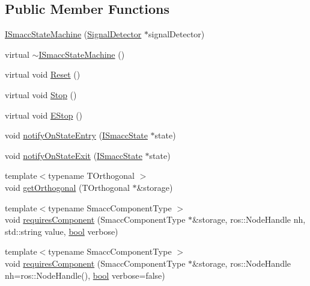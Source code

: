 \subsection*{Public Member Functions}
\begin{DoxyCompactItemize}
\item 
\hyperlink{classsmacc_1_1ISmaccStateMachine_a497c2185584adbec3298d4000277b75e}{I\+Smacc\+State\+Machine} (\hyperlink{classsmacc_1_1SignalDetector}{Signal\+Detector} $\ast$signal\+Detector)
\item 
virtual \hyperlink{classsmacc_1_1ISmaccStateMachine_a54bb9bac0008d3efc6a50cce88dce48e}{$\sim$\+I\+Smacc\+State\+Machine} ()
\item 
virtual void \hyperlink{classsmacc_1_1ISmaccStateMachine_a73d50cda0e1bee05812186bf57d6190e}{Reset} ()
\item 
virtual void \hyperlink{classsmacc_1_1ISmaccStateMachine_a45032346275dcc8e23abece4d524ca3c}{Stop} ()
\item 
virtual void \hyperlink{classsmacc_1_1ISmaccStateMachine_af79fbc17f064bba77e598f5e55a86200}{E\+Stop} ()
\item 
void \hyperlink{classsmacc_1_1ISmaccStateMachine_aab812187ecb452771e91f0003b257cd2}{notify\+On\+State\+Entry} (\hyperlink{classsmacc_1_1ISmaccState}{I\+Smacc\+State} $\ast$state)
\item 
void \hyperlink{classsmacc_1_1ISmaccStateMachine_a9c499f2e3df95a9f72731d2d0d1de0e6}{notify\+On\+State\+Exit} (\hyperlink{classsmacc_1_1ISmaccState}{I\+Smacc\+State} $\ast$state)
\item 
{\footnotesize template$<$typename T\+Orthogonal $>$ }\\void \hyperlink{classsmacc_1_1ISmaccStateMachine_adc18cd0e0b5dbc0b1f308f19346137b5}{get\+Orthogonal} (T\+Orthogonal $\ast$\&storage)
\item 
{\footnotesize template$<$typename Smacc\+Component\+Type $>$ }\\void \hyperlink{classsmacc_1_1ISmaccStateMachine_a7f4c12bb2def8eceb718bd5e9a55076a}{requires\+Component} (Smacc\+Component\+Type $\ast$\&storage, ros\+::\+Node\+Handle nh, std\+::string value, \hyperlink{classbool}{bool} verbose)
\item 
{\footnotesize template$<$typename Smacc\+Component\+Type $>$ }\\void \hyperlink{classsmacc_1_1ISmaccStateMachine_a5f29cd8fe5e651ad18f1b139525ba232}{requires\+Component} (Smacc\+Component\+Type $\ast$\&storage, ros\+::\+Node\+Handle nh=ros\+::\+Node\+Handle(), \hyperlink{classbool}{bool} verbose=false)

\end{DoxyCompactItemize}
